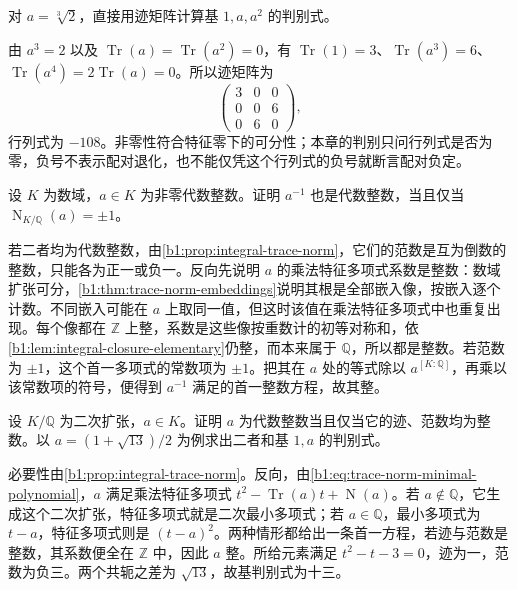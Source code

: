 \begin{exercise}\label{b1:ex:18-cubic-discriminant}
	对 \(a=\sqrt[3]2\)，直接用迹矩阵计算基 \(1,a,a^2\) 的判别式。
\end{exercise}
\begin{solution}
	由 \(a^3=2\) 以及 \(\operatorname{Tr}(a)=\operatorname{Tr}(a^2)=0\)，有 \(\operatorname{Tr}(1)=3\)、\(\operatorname{Tr}(a^3)=6\)、\(\operatorname{Tr}(a^4)=2\operatorname{Tr}(a)=0\)。所以迹矩阵为
	\[
		\begin{pmatrix}3&0&0\\0&0&6\\0&6&0\end{pmatrix},
	\]
	行列式为 \(-108\)。非零性符合特征零下的可分性；本章的判别只问行列式是否为零，负号不表示配对退化，也不能仅凭这个行列式的负号就断言配对负定。
\end{solution}

\begin{exercise}\label{b1:ex:18-integral-unit}
	设 \(K\) 为数域，\(a\in K\) 为非零代数整数。证明 \(a^{-1}\) 也是代数整数，当且仅当 \(\operatorname{N}_{K/\mathbb Q}(a)=\pm1\)。
\end{exercise}
\begin{solution}
	若二者均为代数整数，由\cref{b1:prop:integral-trace-norm}，它们的范数是互为倒数的整数，只能各为正一或负一。反向先说明 \(a\) 的乘法特征多项式系数是整数：数域扩张可分，\cref{b1:thm:trace-norm-embeddings}说明其根是全部嵌入像，按嵌入逐个计数。不同嵌入可能在 \(a\) 上取同一值，但这时该值在乘法特征多项式中也重复出现。每个像都在 \(\mathbb Z\) 上整，系数是这些像按重数计的初等对称和，依\cref{b1:lem:integral-closure-elementary}仍整，而本来属于 \(\mathbb Q\)，所以都是整数。若范数为 \(\pm1\)，这个首一多项式的常数项为 \(\pm1\)。把其在 \(a\) 处的等式除以 \(a^{[K:\mathbb Q]}\)，再乘以该常数项的符号，便得到 \(a^{-1}\) 满足的首一整数方程，故其整。
\end{solution}

\begin{exercise}\label{b1:ex:18-quadratic-integrality}
	设 \(K/\mathbb Q\) 为二次扩张，\(a\in K\)。证明 \(a\) 为代数整数当且仅当它的迹、范数均为整数。以 \(a=(1+\sqrt{13})/2\) 为例求出二者和基 \(1,a\) 的判别式。
\end{exercise}
\begin{solution}
	必要性由\cref{b1:prop:integral-trace-norm}。反向，由\eqref{b1:eq:trace-norm-minimal-polynomial}，\(a\) 满足乘法特征多项式 \(t^2-\operatorname{Tr}(a)t+\operatorname{N}(a)\)。若 \(a\notin\mathbb Q\)，它生成这个二次扩张，特征多项式就是二次最小多项式；若 \(a\in\mathbb Q\)，最小多项式为 \(t-a\)，特征多项式则是 \((t-a)^2\)。两种情形都给出一条首一方程，若迹与范数是整数，其系数便全在 \(\mathbb Z\) 中，因此 \(a\) 整。所给元素满足 \(t^2-t-3=0\)，迹为一，范数为负三。两个共轭之差为 \(\sqrt{13}\)，故基判别式为十三。
\end{solution}

